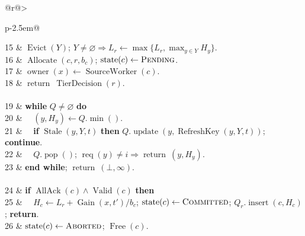 \begin{algorithm}[t]
\begin{tabular}{@{}r@{\hspace{0.5em}}>{\raggedright\arraybackslash}p{\dimexpr\columnwidth-2.5em\relax}@{}}
15 & $\operatorname{Evict}(Y)$; $Y\ne\varnothing\Rightarrow L_r\gets\max\{L_r,\max_{y\in Y}H_y\}$.\\
16 & $\operatorname{Allocate}(c,r,b_c)$; $\operatorname{state}(c)\gets\textsc{Pending}$.\\
17 & $\operatorname{owner}(x)\gets\operatorname{SourceWorker}(c)$.\\
18 & $\operatorname{return}\ \operatorname{TierDecision}(r)$.\\
\\
19 & \textbf{while} $Q\ne\varnothing$ \textbf{do}\\
20 & $\quad(y,H_y)\gets Q.\operatorname{min}()$.\\
21 & $\quad$\textbf{if} $\operatorname{Stale}(y,Y,t)$ \textbf{then} $Q.\operatorname{update}(y,\operatorname{RefreshKey}(y,Y,t))$; \textbf{continue}.\\
22 & $\quad Q.\operatorname{pop}()$; $\operatorname{req}(y)\ne i\Rightarrow\operatorname{return}\ (y,H_y)$.\\
23 & \textbf{end while}; $\operatorname{return}\ (\bot,\infty)$.\\
\\
24 & \textbf{if} $\operatorname{AllAck}(c)\land\operatorname{Valid}(c)$ \textbf{then}\\
25 & $\quad H_c\gets L_r+\operatorname{Gain}(x,t')/b_c$; $\operatorname{state}(c)\gets\textsc{Committed}$; $Q_r.\operatorname{insert}(c,H_c)$; \textbf{return}.\\
26 & $\operatorname{state}(c)\gets\textsc{Aborted}$; $\operatorname{Free}(c)$.\\
\end{tabular}
\end{algorithm}
